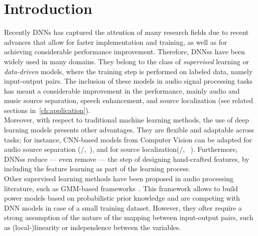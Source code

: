 \section{Introduction}\label{sec:lantern:intro}
Recently \acfp{DNN} has captured the attention of many research fields due to recent advances that allow for faster implementation and training, as well as for achieving considerable performance improvement.
Therefore, \acp{DNN}s have been widely used in many domains.
They belong to the class of \textit{supervised} learning or \textit{data-driven} models, where the training step is performed on labeled data, namely input-output pairs.
The inclusion of these models in audio signal processing tasks has meant a considerable improvement in the performance, mainly audio and music source separation, speech enhancement, and source localization (see related sections in~\cref{ch:application}).
\\Moreover, with respect to traditional machine learning methods, the use of deep learning models presents other advantages.
They are flexible and adaptable across tasks; for instance, \acf{CNN}-based models from Computer Vision can be adapted for audio source separation (\eg/,~), and for source localization(\eg/, ~).
Furthermore, \acp{DNN}s reduce --- even remove --- the step of designing hand-crafted features, by including the feature learning as part of the learning process.
\\Other
{} supervised learning methods have been proposed in audio processing literature, such as \ac{GMM}-based frameworks~.
This framework allows to build power models based on probabilistic prior knowledge and are competing with \ac{DNN} models in case of a small training dataset.
However, they ofter require a strong assumption of the nature of the mapping between input-output pairs, such as (local-)linearity or independence between the variables.

